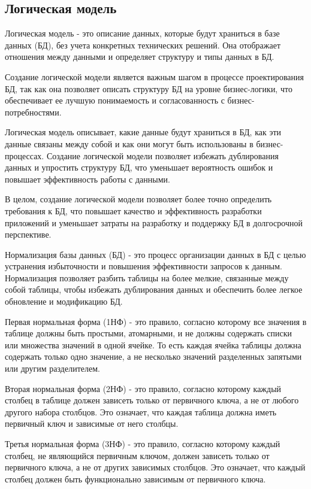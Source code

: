 \subsection{Логическая модель}

Логическая модель - это описание данных, которые будут храниться в базе данных (БД), без учета конкретных технических решений.
Она отображает отношения между данными и определяет структуру и типы данных в БД.

Создание логической модели является важным шагом в процессе проектирования БД, так как она позволяет описать структуру БД на уровне бизнес-логики,
что обеспечивает ее лучшую понимаемость и согласованность с бизнес-потребностями.

Логическая модель описывает, какие данные будут храниться в БД, как эти данные связаны между собой и как они могут быть использованы в бизнес-процессах.
Создание логической модели позволяет избежать дублирования данных и упростить структуру БД, что уменьшает вероятность ошибок и повышает эффективность работы с данными.

В целом, создание логической модели позволяет более точно определить требования к БД,
что повышает качество и эффективность разработки приложений и уменьшает затраты на разработку и поддержку БД в долгосрочной перспективе.

Нормализация базы данных (БД) - это процесс организации данных в БД с целью устранения избыточности и повышения эффективности запросов к данным.
Нормализация позволяет разбить таблицы на более мелкие, связанные между собой таблицы,
чтобы избежать дублирования данных и обеспечить более легкое обновление и модификацию БД.

Первая нормальная форма (1НФ) - это правило, согласно которому все значения в таблице должны быть простыми, атомарными, и не должны содержать списки
или множества значений в одной ячейке.
То есть каждая ячейка таблицы должна содержать только одно значение, а не несколько значений разделенных запятыми или другим разделителем.

Вторая нормальная форма (2НФ) - это правило, согласно которому каждый столбец в таблице должен зависеть только от первичного ключа,
а не от любого другого набора столбцов. Это означает, что каждая таблица должна иметь первичный ключ и зависимые от него столбцы.

Третья нормальная форма (3НФ) - это правило, согласно которому каждый столбец, не являющийся первичным ключом,
должен зависеть только от первичного ключа,
а не от других зависимых столбцов.
Это означает, что каждый столбец должен быть функционально зависимым от первичного ключа.

